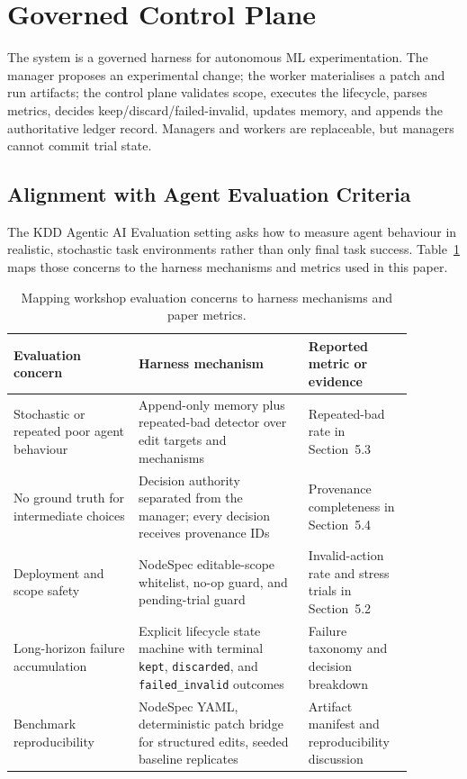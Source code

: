 \section{Governed Control Plane}\label{governed-control-plane}

The system is a governed harness for autonomous ML experimentation. The manager proposes an experimental change; the worker materialises a patch and run artifacts; the control plane validates scope, executes the lifecycle, parses metrics, decides keep/discard/failed-invalid, updates memory, and appends the authoritative ledger record. Managers and workers are replaceable, but managers cannot commit trial state.

\subsection{Alignment with Agent Evaluation Criteria}\label{alignment-with-agent-evaluation-criteria}

The KDD Agentic AI Evaluation setting asks how to measure agent behaviour in realistic, stochastic task environments rather than only final task success. Table~\ref{tab:kdd-alignment} maps those concerns to the harness mechanisms and metrics used in this paper.

\begin{table}[t]
\small
\caption{Mapping workshop evaluation concerns to harness mechanisms and paper metrics.}
\label{tab:kdd-alignment}
\begin{tabular}{@{}
  >{\raggedright\arraybackslash}p{0.28\linewidth}
  >{\raggedright\arraybackslash}p{0.38\linewidth}
  >{\raggedright\arraybackslash}p{0.22\linewidth}@{}}
\toprule
Evaluation concern & Harness mechanism & Reported metric or evidence \\
\midrule
Stochastic or repeated poor agent behaviour & Append-only memory plus repeated-bad detector over edit targets and mechanisms & Repeated-bad rate in Section~5.3 \\
No ground truth for intermediate choices & Decision authority separated from the manager; every decision receives provenance IDs & Provenance completeness in Section~5.4 \\
Deployment and scope safety & NodeSpec editable-scope whitelist, no-op guard, and pending-trial guard & Invalid-action rate and stress trials in Section~5.2 \\
Long-horizon failure accumulation & Explicit lifecycle state machine with terminal \texttt{kept}, \texttt{discarded}, and \texttt{failed\_invalid} outcomes & Failure taxonomy and decision breakdown \\
Benchmark reproducibility & NodeSpec YAML, deterministic patch bridge for structured edits, seeded baseline replicates & Artifact manifest and reproducibility discussion \\
\bottomrule
\end{tabular}
\end{table}


